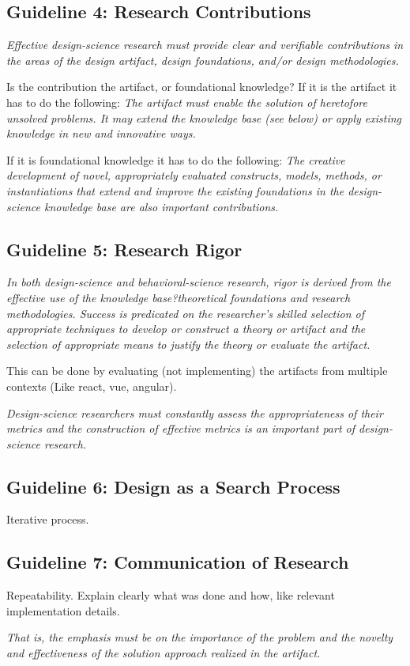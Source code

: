 \subsection{Guideline 4: Research Contributions}
\textit{Effective design-science research must provide clear and verifiable contributions in the areas of the design artifact, design foundations, and/or design methodologies.}

Is the contribution the artifact, or foundational knowledge? If it is the artifact it has to do the following:
\textit{The artifact must enable the solution of heretofore unsolved problems. It may extend the knowledge base (see below) or apply existing knowledge in new and innovative ways.}

If it is foundational knowledge it has to do the following:
\textit{The creative development of novel, appropriately evaluated constructs, models, methods, or instantiations that extend and improve the existing foundations in the design-science knowledge base are also important contributions.}

\subsection{Guideline 5: Research Rigor}
\textit{In both design-science and behavioral-science research, rigor is derived from the effective use of the knowledge base?theoretical foundations and research methodologies. Success is predicated on the researcher's skilled selection of appropriate techniques to develop or construct a theory or artifact and the selection of appropriate means to justify the theory or evaluate the artifact.}

This can be done by evaluating (not implementing) the artifacts from multiple contexts (Like react, vue, angular).

\textit{Design-science researchers must constantly assess the appropriateness of their metrics and the construction of effective metrics is an important part of design-science research.}

\subsection{Guideline 6: Design as a Search Process}
Iterative process.

\subsection{Guideline 7: Communication of Research}
Repeatability. Explain clearly what was done and how, like relevant implementation details.

\textit{That is, the emphasis must be on the importance of the problem and the novelty and effectiveness of the solution approach realized in the artifact.}